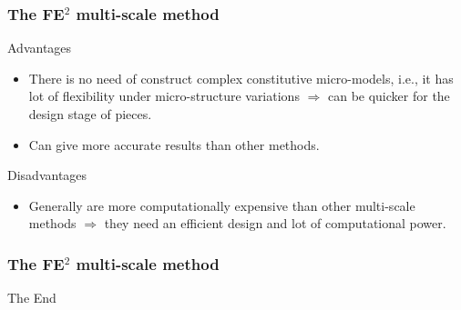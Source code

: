 \documentclass[usenames,dvipsnames]{beamer}
\begin{document}
\begin{frame}
\frametitle{The FE$^2$ multi-scale method}
{\color{ForestGreen}Advantages}
\begin{itemize}
\item There is no need of construct complex constitutive micro-models, i.e., it has lot of flexibility under
micro-structure variations $\Rightarrow$ can be quicker for the design
stage of pieces.
\item Can give more accurate results than other methods.
\end{itemize}

{\color{Red}Disadvantages}
\begin{itemize}
\item Generally are more computationally expensive than other multi-scale methods $\Rightarrow$ they need an efficient
design and lot of computational power. 
\end{itemize}
\end{frame}


\begin{frame}
\frametitle{The FE$^2$ multi-scale method}

\begin{figure}[!ht]
\resizebox{1.0\linewidth}{!}{}
\end{figure}
\end{frame}


\begin{frame}
\begin{figure}[!ht]
\resizebox{0.8\linewidth}{!}{}
\end{figure}
\end{frame}


\begin{frame}
\begin{figure}[!ht]
\resizebox{1.0\linewidth}{!}{}
\end{figure}
\end{frame}


\begin{frame}
\Huge{\centerline{The End}}
\end{frame}

\end{document}
